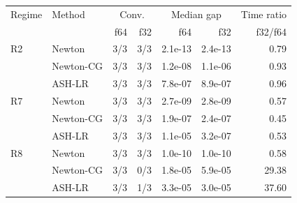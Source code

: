 \begin{tabular}{llrrrrr}
\toprule
Regime & Method & \multicolumn{2}{c}{Conv.} & \multicolumn{2}{c}{Median gap} & Time ratio \\
 & & f64 & f32 & f64 & f32 & f32/f64 \\
\midrule
R2 & Newton & 3/3 & 3/3 & 2.1e-13 & 2.4e-13 & 0.79 \\
 & Newton-CG & 3/3 & 3/3 & 1.2e-08 & 1.1e-06 & 0.93 \\
 & ASH-LR & 3/3 & 3/3 & 7.8e-07 & 8.9e-07 & 0.96 \\
\midrule
R7 & Newton & 3/3 & 3/3 & 2.7e-09 & 2.8e-09 & 0.57 \\
 & Newton-CG & 3/3 & 3/3 & 1.9e-07 & 2.4e-07 & 0.45 \\
 & ASH-LR & 3/3 & 3/3 & 1.1e-05 & 3.2e-07 & 0.53 \\
\midrule
R8 & Newton & 3/3 & 3/3 & 1.0e-10 & 1.0e-10 & 0.58 \\
 & Newton-CG & 3/3 & 0/3 & 1.8e-05 & 5.9e-05 & 29.38 \\
 & ASH-LR & 3/3 & 1/3 & 3.3e-05 & 3.0e-05 & 37.60 \\
\bottomrule
\end{tabular}